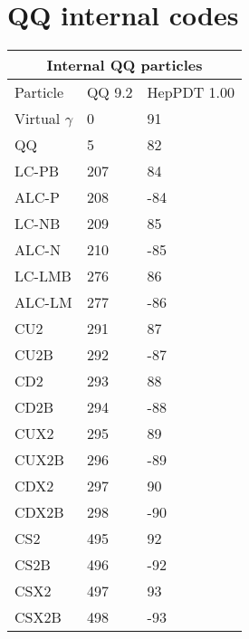 
\section { QQ internal codes}
\vspace{0.2in}

\begin{tabular}{|l|l|l|} \hline
\multicolumn{3}{|c|}{Internal QQ particles} \\ \hline
Particle &   QQ 9.2 & HepPDT 1.00 \\ \hline
Virtual $\gamma$ &   0 &  91 \\ \hline
QQ &   5 &  82 \\ \hline
LC-PB & 207 & 84 \\ \hline
ALC-P & 208 & -84 \\ \hline
LC-NB & 209 & 85 \\ \hline
ALC-N & 210 & -85 \\ \hline
LC-LMB & 276 & 86 \\ \hline
ALC-LM & 277 & -86 \\ \hline
CU2 & 291 & 87 \\ \hline
CU2B & 292 & -87 \\ \hline
CD2 & 293 & 88 \\ \hline
CD2B & 294 & -88 \\ \hline
CUX2 & 295 & 89 \\ \hline
CUX2B & 296 & -89 \\ \hline
CDX2 & 297 & 90 \\ \hline
CDX2B & 298 & -90 \\ \hline
CS2 & 495 & 92 \\ \hline
CS2B & 496 & -92 \\ \hline
CSX2 & 497 & 93 \\ \hline
CSX2B & 498 & -93 \\ \hline
\end{tabular}

\vfill\eject

